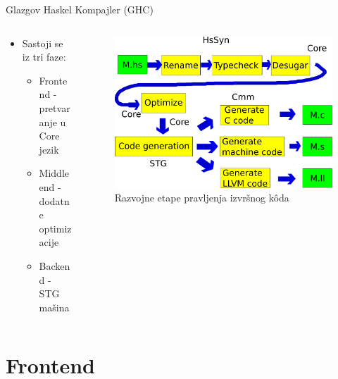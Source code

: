 \documentclass{beamer}
\begin{document}
\begin{frame}{Glazgov Haskel Kompajler (GHC) }
	\begin{columns}
		\begin{column}{4cm}
			\begin{itemize}
				\item Sastoji se iz tri faze:
				
				\begin{itemize}
					\item Frontend - pretvaranje u Core jezik
					\item Middle end - dodatne optimizacije 
					\item Backend - STG mašina
				\end{itemize}
			\end{itemize}
		\end{column}
		\begin{column}{6cm}
			\begin{figure}[h!]
				\begin{center}
					\includegraphics[scale=0.20]{../resources/razvojneEtape.png}
				\end{center}
				\caption{Razvojne etape pravljenja izvršnog k\^{o}da}
				\label{fig:razvojneEtaple}
			\end{figure}
		\end{column}
	\end{columns}
\end{frame}

\section{Frontend}
\end{document}

